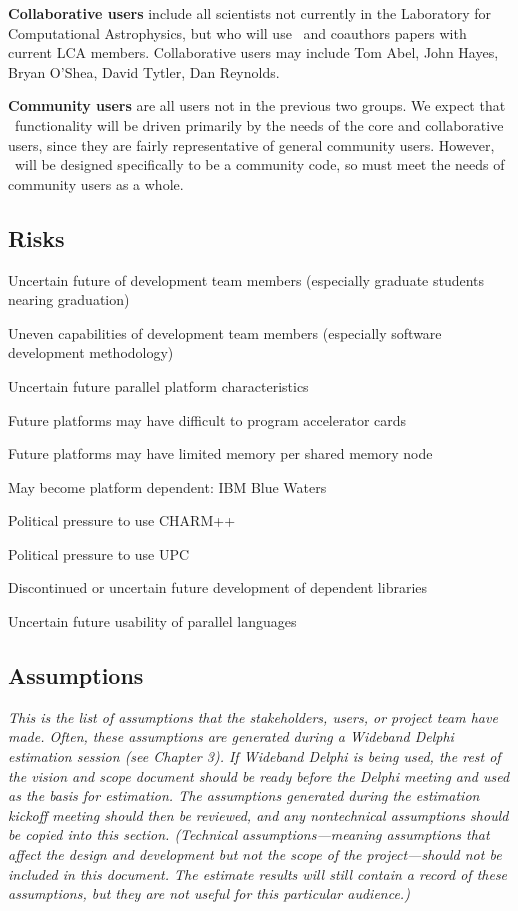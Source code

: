 \documentclass[12pt]{article}
\begin{document}
    \textbf{Collaborative users} include all scientists not currently
    in the Laboratory for Computational Astrophysics, but who will use
    \cello\ and coauthors papers with current LCA members.
    Collaborative users may include Tom Abel, John Hayes, Bryan
    O'Shea, David Tytler, Dan Reynolds.

    \textbf{Community users} are all users not in the previous two
    groups.  We expect that \cello\ functionality will be driven
    primarily by the needs of the core and collaborative users, since
    they are fairly representative of general community users.
    However, \cello\ will be designed specifically to be a community
    code, so must meet the needs of community users as a whole.
    
\subsection{Risks}

Uncertain future of development team members (especially graduate students nearing graduation)

Uneven capabilities of development team members (especially software development methodology)

Uncertain future parallel platform characteristics

Future platforms may have difficult to program accelerator cards

Future platforms may have limited memory per shared memory node

May become platform dependent: IBM Blue Waters

Political pressure to use CHARM++

Political pressure to use UPC

Discontinued or uncertain future development of dependent libraries


Uncertain future usability of parallel languages

   


\subsection{Assumptions}

    \textit{This is the list of assumptions that the stakeholders, users, or
    project team have made. Often, these assumptions are generated
    during a Wideband Delphi estimation session (see Chapter 3). If
    Wideband Delphi is being used, the rest of the vision and scope
    document should be ready before the Delphi meeting and used as the
    basis for estimation. The assumptions generated during the
    estimation kickoff meeting should then be reviewed, and any
    nontechnical assumptions should be copied into this
    section. (Technical assumptions---meaning assumptions that affect
    the design and development but not the scope of the
    project---should not be included in this document. The estimate
    results will still contain a record of these assumptions, but they
    are not useful for this particular audience.)}
\end{document}
